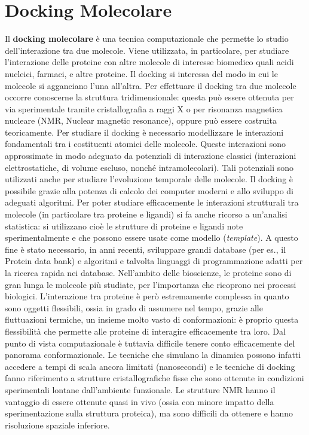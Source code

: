 \section{Docking Molecolare}
Il \textbf{docking molecolare} è una tecnica computazionale che permette lo studio dell’interazione tra due molecole. Viene utilizzata, in particolare, per studiare l’interazione delle proteine con altre molecole di interesse biomedico quali acidi nucleici, farmaci, e altre proteine. Il docking si interessa del modo in cui le molecole si agganciano l’una all’altra.\newline
Per effettuare il docking tra due molecole occorre conoscerne la struttura tridimensionale: questa può essere ottenuta per via sperimentale tramite cristallografia a raggi X o per risonanza magnetica nucleare (NMR, Nuclear magnetic resonance), oppure può essere costruita teoricamente. Per studiare il docking è necessario modellizzare le interazioni fondamentali tra i costituenti atomici delle molecole. Queste interazioni sono approssimate in modo adeguato da potenziali di interazione classici (interazioni elettrostatiche, di volume escluso, nonché intramolecolari). Tali potenziali sono utilizzati anche per studiare l’evoluzione temporale delle molecole.\newline 
Il docking è possibile grazie alla potenza di calcolo dei computer moderni e allo sviluppo di adeguati algoritmi. Per poter studiare efficacemente le interazioni strutturali tra molecole (in particolare tra proteine e ligandi) si fa anche ricorso a un’analisi statistica: si utilizzano cioè le strutture di proteine e ligandi note sperimentalmente e che possono essere usate come modello (\textit{template}). A questo fine è stato necessario, in anni recenti, sviluppare grandi database (per es., il Protein data bank) e algoritmi e talvolta linguaggi di programmazione adatti per la ricerca rapida nei database. Nell’ambito delle bioscienze, le proteine sono di gran lunga le molecole più studiate, per l’importanza che ricoprono nei processi biologici. L’interazione tra proteine è però estremamente complessa in quanto sono oggetti flessibili, ossia in grado di assumere nel tempo, grazie alle fluttuazioni termiche, un insieme molto vasto di conformazioni: è proprio questa flessibilità che permette alle proteine di interagire efficacemente tra loro. Dal punto di vista computazionale è tuttavia difficile tenere conto efficacemente del panorama conformazionale. Le tecniche che simulano la dinamica possono infatti accedere a tempi di scala ancora limitati (nanosecondi) e le tecniche di docking fanno riferimento a strutture cristallografiche fisse che sono ottenute in condizioni sperimentali lontane dall’ambiente funzionale. Le strutture NMR hanno il vantaggio di essere ottenute quasi in vivo (ossia con minore impatto della sperimentazione sulla struttura proteica), ma sono difficili da ottenere e hanno risoluzione spaziale inferiore.\newline
